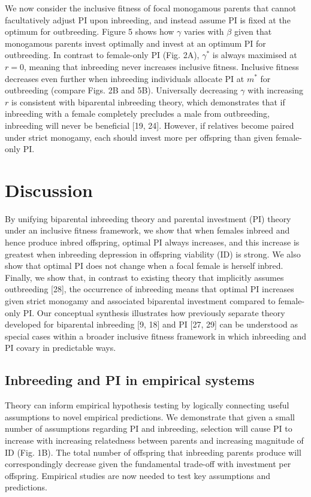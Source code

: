 \documentclass[12pt]{article}
\begin{document}
We now consider the inclusive fitness of focal monogamous parents that cannot facultatively adjust PI upon inbreeding, and instead assume PI is fixed at the optimum for outbreeding. Figure 5 shows how $\gamma$ varies with $\beta$ given that monogamous parents invest optimally and invest at an optimum PI for outbreeding. In contrast to female-only PI (Fig. 2A), $\gamma^{*}$ is always maximised at $r=0$, meaning that inbreeding never increases inclusive fitness. Inclusive fitness decreases even further when inbreeding individuals allocate PI at $m^{*}$ for outbreeding (compare Figs. 2B and 5B). Universally decreasing $\gamma$ with increasing $r$ is consistent with biparental inbreeding theory, which demonstrates that if inbreeding with a female completely precludes a male from outbreeding, inbreeding will never be beneficial [19, 24]. However, if relatives become paired under strict monogamy, each should invest more per offspring than given female-only PI.

\section*{Discussion}

By unifying biparental inbreeding theory and parental investment (PI) theory under an inclusive fitness framework, we show that when females inbreed and hence produce inbred offspring, optimal PI always increases, and this increase is greatest when inbreeding depression in offspring viability (ID) is strong. We also show that optimal PI does not change when a focal female is herself inbred. Finally, we show that, in contrast to existing theory that implicitly assumes outbreeding [28], the occurrence of inbreeding means that optimal PI increases given strict monogamy and associated biparental investment compared to female-only PI. Our conceptual synthesis illustrates how previously separate theory developed for biparental inbreeding [9, 18] and PI [27, 29] can be understood as special cases within a broader inclusive fitness framework in which inbreeding and PI covary in predictable ways.

\subsection*{Inbreeding and PI in empirical systems}

Theory can inform empirical hypothesis testing by logically connecting useful assumptions to novel empirical predictions. We demonstrate that given a small number of assumptions regarding PI and inbreeding, selection will cause PI to increase with increasing relatedness between parents and increasing magnitude of ID (Fig. 1B). The total number of offspring that inbreeding parents produce will correspondingly decrease given the fundamental trade-off with investment per offspring. Empirical studies are now needed to test key assumptions and predictions.
\end{document}

